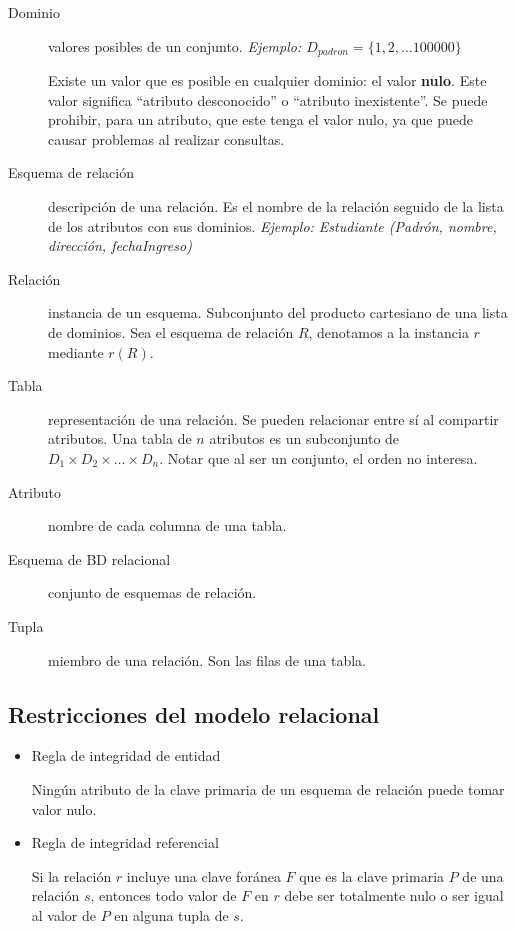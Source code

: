 \documentclass[a4paper, twoside]{article}
\begin{document}
\begin{description}
	\item[Dominio] valores posibles de un conjunto. \emph{Ejemplo: $D_{padron}=\{1,2,\dots100000\}$}

	Existe un valor que es posible en cualquier dominio: el valor \textbf{nulo}. Este valor significa ``atributo desconocido'' o ``atributo inexistente''. Se puede prohibir, para un atributo, que este tenga el valor nulo, ya que puede causar problemas al realizar consultas.

	\item[Esquema de relación] descripción de una relación. Es el nombre de la relación seguido de la lista de los atributos con sus dominios. \emph{Ejemplo: Estudiante (Padrón, nombre, dirección, fechaIngreso)}

	\item[Relación] instancia de un esquema. Subconjunto del producto cartesiano de una lista de dominios\emph{. }Sea el esquema de relación $R$, denotamos a la instancia $r$ mediante $r(R)$.

	\item[Tabla] representación de una relación. Se pueden relacionar entre sí al compartir atributos. Una tabla de $n$ atributos es un subconjunto de $D_{1}\times D_{2}\times\dots\times D_{n}$. Notar que al ser un conjunto, el orden no interesa.

	\item[Atributo] nombre de cada columna de una tabla.

	\item[Esquema de BD relacional] conjunto de esquemas de relación.

	\item[Tupla] miembro de una relación. Son las filas de una tabla.
\end{description}

\subsection{Restricciones del modelo relacional}
\begin{itemize}
	\item Regla de integridad de entidad

	Ningún atributo de la clave primaria de un esquema de relación puede tomar valor nulo.

	\item Regla de integridad referencial

	Si la relación $r$ incluye una clave foránea $F$ que es la clave primaria $P$ de una relación $s$, entonces todo valor de $F$ en $r$ debe ser totalmente nulo o ser igual al valor de $P$ en alguna tupla de $s$.
\end{itemize}
\end{document}
